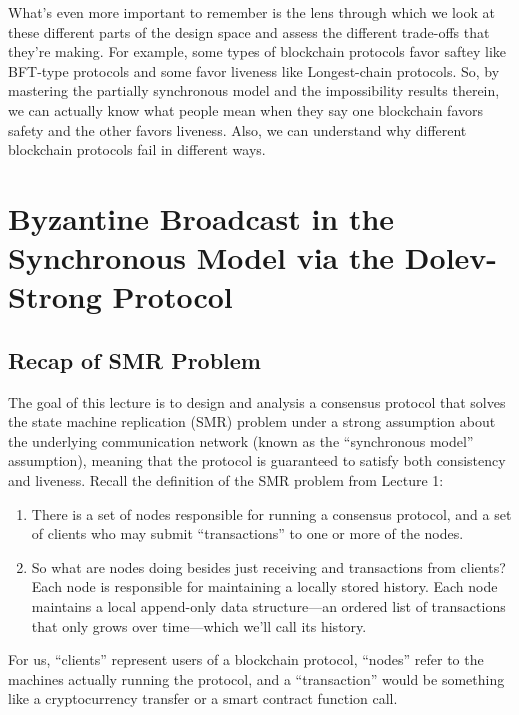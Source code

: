 What's even more important to remember is the lens through which we look at these different parts of the design space and assess the different trade-offs that they're making. For example, some types of blockchain protocols favor saftey like BFT-type protocols and some favor liveness like Longest-chain protocols. So, by mastering the partially synchronous model and the impossibility results therein, we can actually know what people mean when they say one blockchain favors safety and the other favors liveness. Also, we can understand why different blockchain protocols fail in different ways.



\chapter{Byzantine Broadcast in the
Synchronous Model via the
Dolev-Strong Protocol}

\section{Recap of SMR Problem}
The goal of this lecture is to design and analysis a consensus protocol that solves the state
machine replication (SMR) problem under a strong assumption about the underlying communication network (known as the “synchronous model” assumption), meaning that the
protocol is guaranteed to satisfy both consistency and liveness. Recall the definition of the
SMR problem from Lecture 1:\\

\begin{enumerate}
    \item There is a set of nodes responsible for running a consensus protocol, and a set of clients
who may submit “transactions” to one or more of the nodes. 

    \item So what are nodes doing besides just
receiving and transactions from clients?
Each node is
responsible for maintaining a locally
stored history. Each node maintains a local append-only data structure—an ordered list of transactions that only grows over time—which we’ll call its history.

\end{enumerate}

For us, “clients” represent users of a blockchain protocol, “nodes” refer to the machines
actually running the protocol, and a “transaction” would be something like a cryptocurrency
transfer or a smart contract function call.

